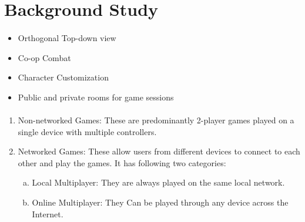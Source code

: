 \documentclass[oneside,12pt]{Classes/VTU}
\begin{document}
		\section{Background Study}
			\thispagestyle{fancy}
			\paragraph{}
			
			\paragraph{}
			\begin{itemize}
				\item Orthogonal Top-down view
				\item Co-op Combat
				\item Character Customization
				\item Public and private rooms for game sessions
			\end{itemize}
			\paragraph{}
			\begin{enumerate}
				\item Non-networked Games: These are predominantly 2-player games played on a single device with multiple controllers.
				\item Networked Games: These allow users from different devices to connect to each other and play the games. It has following two categories: 
				\begin{enumerate}[a.]
					\item Local Multiplayer: They are always played on the same local network.
					\item Online Multiplayer: They Can be played through any device across the Internet.
				\end{enumerate}
			\end{enumerate}
			
\end{document}
